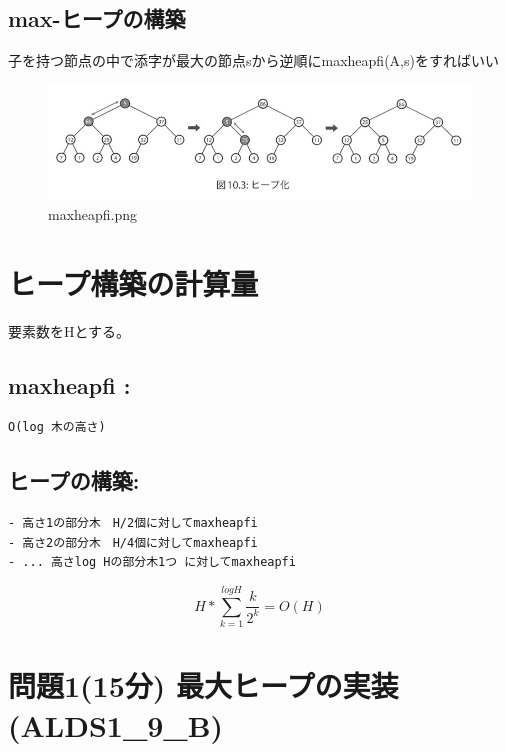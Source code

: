 \documentclass[a4paper,dvipdfmx]{jsarticle}
\makeatletter
\def\maxwidth{\ifdim\Gin@nat@width>\linewidth\linewidth
    \else\Gin@nat@width\fi}
\let\Oldincludegraphics\includegraphics
\renewcommand{\includegraphics}[1]{\Oldincludegraphics[width=.8\maxwidth]{#1}}
\makeatother
\begin{document}
\subsection{max-ヒープの構築}\label{max-ux30d2ux30fcux30d7ux306eux69cbux7bc9}

子を持つ節点の中で添字が最大の節点sから逆順にmaxheapfi(A,s)をすればいい

\begin{figure}
\centering
\includegraphics{imgs/maxheapfi.png}
\caption{maxheapfi.png}
\end{figure}

    \section{ヒープ構築の計算量}\label{ux30d2ux30fcux30d7ux69cbux7bc9ux306eux8a08ux7b97ux91cf}

要素数をHとする。

\subsection{maxheapfi :}\label{maxheapfi}

\begin{verbatim}
O(log 木の高さ)
\end{verbatim}

\subsection{ヒープの構築:}\label{ux30d2ux30fcux30d7ux306eux69cbux7bc9}

\begin{verbatim}
- 高さ1の部分木　H/2個に対してmaxheapfi
- 高さ2の部分木　H/4個に対してmaxheapfi
- ... 高さlog Hの部分木1つ に対してmaxheapfi
\end{verbatim}

\[ H * \sum^{logH}_{k=1} \frac{k}{2^k} = O(H) \]

    \section{問題1(15分)
最大ヒープの実装(ALDS1\_9\_B)}\label{ux554fux984c115ux5206-ux6700ux5927ux30d2ux30fcux30d7ux306eux5b9fux88c5alds1_9_b}
\end{document}
